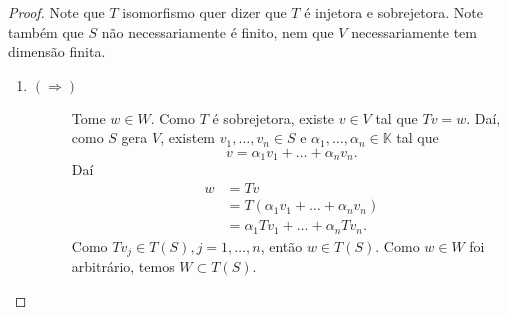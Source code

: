 \documentclass{article}
\newcommand{\K}{\mathbb{K}}
\begin{document}
\begin{proof}
  Note que $T$ isomorfismo quer dizer que $T$ é injetora e sobrejetora.
  Note também que $S$ não necessariamente é finito, nem que $V$ necessariamente
  tem dimensão finita.
  \begin{enumerate}
    \item
    \begin{description}
      \item[$(\Rightarrow)$]
        Tome $w\in W$.
        Como $T$ é sobrejetora, existe $v\in V$ tal que $Tv=w$.
        Daí, como $S$ gera $V$, existem $v_1,\dots,v_n\in S$ e
        $\alpha_1,\dots,\alpha_n\in\K$ tal que
        $$ v = \alpha_1v_1 + \dots + \alpha_nv_n. $$
        Daí
        \begin{align*}
          w & = Tv \\
            & = T(\alpha_1v_1 + \dots + \alpha_nv_n) \\
            & = \alpha_1Tv_1 + \dots + \alpha_nTv_n.
        \end{align*}
        Como $Tv_j\in T(S), j = 1,\dots,n$, então $w\in T(S)$.
        Como $w\in W$ foi arbitrário, temos $W\subset T(S)$.


\end{description}
\end{enumerate}
\end{proof}
\end{document}

